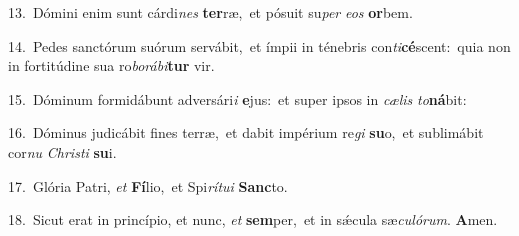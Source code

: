 {\numbfont\textcolor{\numbcolor}{13.}}~Dómini enim sunt cárdi\textit{nes} \textbf{ter}\-ræ,~\star et pósuit su\textit{per} \textit{e}\-\textit{os} \textbf{or}\-bem.\par
{\numbfont\textcolor{\numbcolor}{14.}}~Pedes sanctórum suórum servábit,~\dagger et ímpii in ténebris con\-\textit{ti}\-\textbf{cé}scent:~\star quia non in fortitúdine sua ro\-\textit{bo}\-\textit{rá}\textit{bi}\textbf{tur} vir.\par
{\numbfont\textcolor{\numbcolor}{15.}}~Dóminum formidábunt adversári\textit{i} \textbf{e}\-jus:~\star et super ipsos in \textit{cæ}\-\textit{lis} \textit{to}\-\textbf{ná}bit:\par
{\numbfont\textcolor{\numbcolor}{16.}}~Dóminus judicábit fines terræ,~\dagger et dabit impérium re\textit{gi} \textbf{su}\-o,~\star et sublimábit cor\textit{nu} \textit{Chris}\-\textit{ti} \textbf{su}\-i.\par
{\numbfont\textcolor{\numbcolor}{17.}}~Glória Patri, \textit{et} \textbf{Fí}\-lio,~\star et Spi\-\textit{rí}\-\textit{tu}\textit{i} \textbf{Sanc}\-to.\par
{\numbfont\textcolor{\numbcolor}{18.}}~Sicut erat in princípio, et nunc, \textit{et} \textbf{sem}\-per,~\star et in sǽcula sæ\-\textit{cu}\-\textit{ló}\textit{rum}. \textbf{A}\-men.\par
